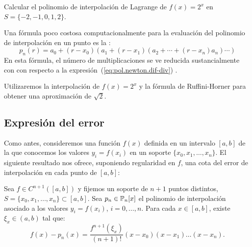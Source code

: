     \begin{example}
      Calcular el polinomio de interpolación de Lagrange de $f(x)=2^x$ en
      $S=\{-2,-1,0,1,2\}$. 
    \end{example}

    Una fórmula poco costosa computacionalmente para la evaluación del
    polinomio de interpolación en un punto es la : 
    \begin{equation*}
      p_n(r) = a_0 + (r-x_0)(a_1 + (r-x_1)(a_2 + \cdots + (r-x_n)a_n)\cdots)
    \end{equation*}
    En esta fórmula, el número de multiplicaciones se ve reducida
    sustancialmente con con respecto a la
    expresión~(\ref{eq:pol.newton.dif-div}) .
    \begin{example}
      Utilizaremos la interpolación de $f(x)=2^x$ y la fórmula de
      Ruffini-Horner para obtener una aproximación de $\sqrt{2}$.
    \end{example}

    \subsection{Expresión del error}
    \label{sec:error-interpol-lagrange}
    Como antes, consideremos una función $f(x)$ definida en un intervalo
    $[a,b]$ de la que conocemos los valores $y_i=f(x_i)$ en un soporte
    $\{x_0,x_1,\dots,x_n\}$. El siguiente resultado nos ofrece, suponiendo
    regularidad en $f$, una cota del error de interpolación en cada punto
    de $[a,b]$:
    \begin{theorem}
      \label{thm:error-interpol-lagrange}
      Sea $f\in C^{n+1}([a,b])$ y fijemos un soporte de $n+1$ puntos
      distintos, $S=\{x_0,x_1,\dots,x_n\}\subset[a,b]$. Sea
      $p_n\in\operatorname{{\mathbb P}}_n[x]$ el polinomio de interpolación asociado a los valores
      $y_i=f(x_i)$, $i=0,...,n$. Para cada $x\in[a,b]$, existe $\xi_x\in
      (a,b)$ tal que:
      \begin{equation}
        \label{eq:expresion-error-interpol}
        f(x)-p_n(x)=\frac{f^{n+1}(\xi_x)}{(n+1)!} (x-x_0)(x-x_1)\dots(x-x_n).
      \end{equation}
    \end{theorem}

